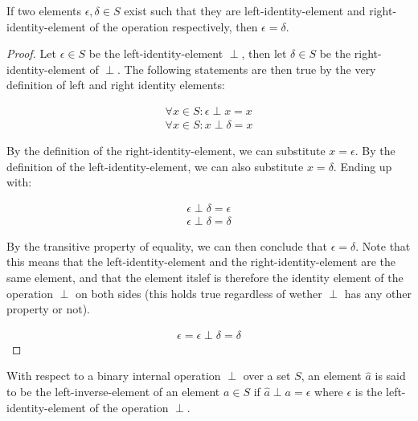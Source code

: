 \newpage

\begin{lemma}
    If two elements $\epsilon, \delta \in S$ exist such that they are left-identity-element and right-identity-element of the operation 
    respectively, then $\epsilon = \delta$.
\end{lemma}
\begin{proof}
    Let $\epsilon \in S$ be the left-identity-element $\perp$, then let $\delta \in S$ be the right-identity-element of $\perp$. The following statements 
    are then true by the very definition of left and right identity elements:

    \begin{align*}
        \forall x \in S: \epsilon \perp x = x \\
        \forall x \in S: x \perp \delta = x
    \end{align*}

    By the definition of the right-identity-element, we can substitute $x = \epsilon$. By the definition of the 
    left-identity-element, we can also substitute $x = \delta$. Ending up with:

    \begin{align*}
        \epsilon \perp \delta = \epsilon \\
        \epsilon \perp \delta = \delta
    \end{align*}

    By the transitive property of equality, we can then conclude that $\epsilon = \delta$. Note that this means that 
    the left-identity-element and the right-identity-element are the same element, and that the element itslef is therefore 
    the identity element of the operation $\perp$ on both sides (this holds true regardless of wether $\perp$ has any other property or not).

    \begin{align*}
        \epsilon = \epsilon \perp \delta = \delta
    \end{align*}

\end{proof}


\begin{definition}
    With respect to a binary internal operation $\perp$ over a set $S$, an element $\hat{a}$ is said to be the left-inverse-element of
    an element $a \in S$ if $\hat{a} \perp a = \epsilon$ where $\epsilon$ is the left-identity-element of the operation $\perp$.
\end{definition}

